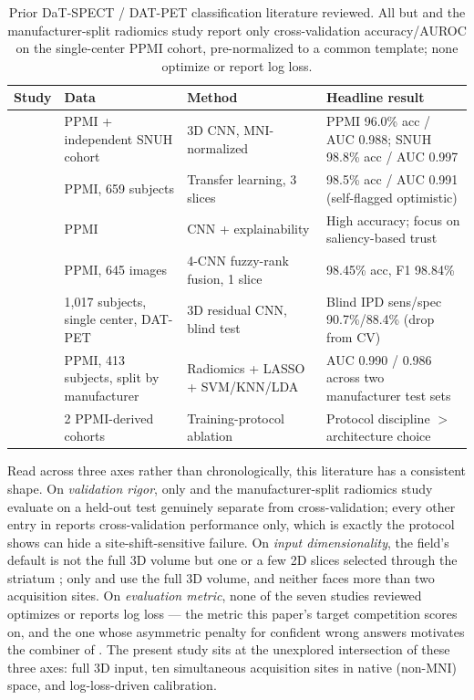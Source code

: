 \documentclass[10pt]{article}
\begin{document}
\begin{table}[t]
\centering
\small
\caption{Prior DaT-SPECT / DAT-PET classification literature reviewed. All but \citet{zhao2022} and the manufacturer-split radiomics study \citep{radiomics2022} report only cross-validation accuracy/AUROC on the single-center PPMI cohort, pre-normalized to a common template; none optimize or report log loss.}
\label{tab:related}
\begin{tabular}{@{}p{2.6cm}p{3.4cm}p{3.9cm}p{3.9cm}@{}}
\toprule
\textbf{Study} & \textbf{Data} & \textbf{Method} & \textbf{Headline result} \\
\midrule
\citet{choi2017} & PPMI + independent SNUH cohort & 3D CNN, MNI-normalized & PPMI 96.0\% acc / AUC 0.988; SNUH 98.8\% acc / AUC 0.997 \\
\citet{quan2019} & PPMI, 659 subjects & Transfer learning, 3 slices & 98.5\% acc / AUC 0.991 (self-flagged optimistic) \\
\citet{nazari2021} & PPMI & CNN + explainability & High accuracy; focus on saliency-based trust \\
\citep{ensemblefusion2022} & PPMI, 645 images & 4-CNN fuzzy-rank fusion, 1 slice & 98.45\% acc, F1 98.84\% \\
\citet{zhao2022} & 1{,}017 subjects, single center, DAT-PET & 3D residual CNN, blind test & Blind IPD sens/spec 90.7\%/88.4\% (drop from CV) \\
\citep{radiomics2022} & PPMI, 413 subjects, split by manufacturer & Radiomics + LASSO + SVM/KNN/LDA & AUC 0.990 / 0.986 across two manufacturer test sets \\
\citep{trainingprotocol2026} & 2 PPMI-derived cohorts & Training-protocol ablation & Protocol discipline $>$ architecture choice \\
\bottomrule
\end{tabular}
\end{table}

Read across three axes rather than chronologically, this literature has a consistent shape. On \emph{validation rigor}, only \citet{zhao2022} and the manufacturer-split radiomics study \citep{radiomics2022} evaluate on a held-out test genuinely separate from cross-validation; every other entry in  reports cross-validation performance only, which is exactly the protocol  shows can hide a site-shift-sensitive failure. On \emph{input dimensionality}, the field's default is not the full 3D volume but one or a few 2D slices selected through the striatum \citep{quan2019,ensemblefusion2022}; only \citet{choi2017} and \citet{zhao2022} use the full 3D volume, and neither faces more than two acquisition sites. On \emph{evaluation metric}, none of the seven studies reviewed optimizes or reports log loss --- the metric this paper's target competition scores on, and the one whose asymmetric penalty for confident wrong answers motivates the combiner of . The present study sits at the unexplored intersection of these three axes: full 3D input, ten simultaneous acquisition sites in native (non-MNI) space, and log-loss-driven calibration.
\end{document}
